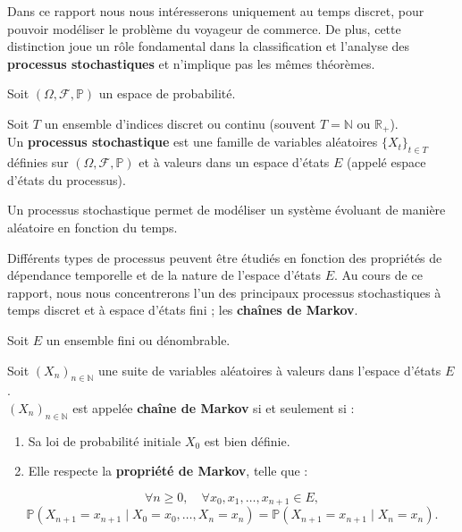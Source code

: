 \documentclass{article}
\begin{document}
Dans ce rapport nous nous intéresserons uniquement au temps discret, pour pouvoir modéliser le problème du voyageur de commerce.
De plus, cette distinction joue un rôle fondamental dans la classification et l'analyse des \textbf{processus stochastiques} et n'implique pas les mêmes théorèmes. \\

\begin{tcolorbox}[colback=white,colframe=blue!80!black,title=Processus Stochastique]
Soit $(\Omega, \mathcal{F}, \mathbb{P})$ un espace de probabilité.

Soit $T$ un ensemble d'indices discret ou continu (souvent $T = \mathbb{N}$ ou $\mathbb{R}_+$). \\

Un \textbf{processus stochastique} est une famille de variables aléatoires $\{X_t\}_{t \in T}$ définies sur $(\Omega, \mathcal{F}, \mathbb{P})$ et à valeurs dans un espace d'états $E$ (appelé espace d'états du processus).
\end{tcolorbox}

Un processus stochastique permet de modéliser un système évoluant de manière aléatoire en fonction du temps.

Différents types de processus peuvent être étudiés en fonction des propriétés de dépendance temporelle et de la nature de l'espace d'états $E$.
Au cours de ce rapport, nous nous concentrerons l'un des principaux processus stochastiques à temps discret et à espace d'états fini ; les \textbf{chaînes de Markov}. \\

\begin{tcolorbox}[colback=white,colframe=red!80!black,title=Chaîne de Markov]
Soit $E$ un ensemble fini ou dénombrable.

Soit $(X_n)_{n \in \mathbb{N}}$ une suite de variables aléatoires à valeurs dans l'espace d'états $E$. \\

$(X_n)_{n \in \mathbb{N}}$ est appelée \textbf{chaîne de Markov} si et seulement si :
\begin{enumerate}[leftmargin=5em, label=(\arabic*)]
    \item Sa loi de probabilité initiale $X_0$ est bien définie.
    \item Elle respecte la \textbf{propriété de Markov}, telle que :
\end{enumerate}
\[
\forall n \geq 0, \quad \forall x_0, x_1, \dots, x_{n+1} \in E,
\]
\[
\mathbb{P}(X_{n+1} = x_{n+1} \mid X_0 = x_0, \dots, X_n = x_n) = \mathbb{P}(X_{n+1} = x_{n+1} \mid X_n = x_n).
\]
\end{tcolorbox}
\end{document}
